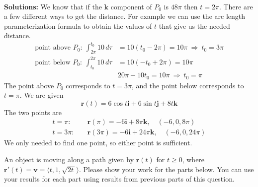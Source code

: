 \begin{enumerate}
        \ifnum {} {\color{DarkBlue} \\[12pt] 
        \textbf{Solutions:} We know that if the $\mathbf k$ component of $P_0$ is $48\pi$ then $t=2\pi$. There are a few different ways to get the distance. For example we can use the arc length parameterization formula to obtain the values of $t$ that give us the needed distance. 
        \begin{align}
            \text{point above } P_0: \ \int_{2\pi}^{t_0} 10 \, d\tau &= 10(t_0 - 2\pi) = 10\pi \ \Rightarrow \ t_0 = 3\pi\\
            \text{point below } P_0: \ \int_{t_0}^{2\pi} 10 \, d\tau 
            &= 10(- t_0 + 2\pi) = 10\pi \\
            & 20\pi - 10 t_0 = 10\pi \ \Rightarrow \ t_0 = \pi
        \end{align}
        The point above $P_0$ corresponds to $t=3\pi$, and the point below corresponds to $t = \pi$. We are given
        $$\mathbf r(t) = 6\cos t \mathbf i + 6 \sin t \mathbf j + 8t\mathbf k$$ 
        The two points are 
        \begin{align}
            t = \pi: \quad & \mathbf r(\pi) = -6\mathbf i + 8\pi\mathbf k , \quad (-6,0,8\pi)\\
            t = 3\pi: \quad & \mathbf r(3\pi) = -6\mathbf i + 24\pi\mathbf k , \quad (-6,0,24\pi)
        \end{align}
        We only needed to find one point, so either point is sufficient. 
        } 
        \else 
        \fi
    \end{enumerate}
\fi



\ifnum {}
\question[6]  An object is moving along a path given by $\mathbf r(t)$ for $t \ge 0$, where $ \mathbf r '(t) = \mathbf v = \langle t, 1, \sqrt{2t\,} \rangle$. Please show your work for the parts below. You can use your results for each part using results from previous parts of this question.   

